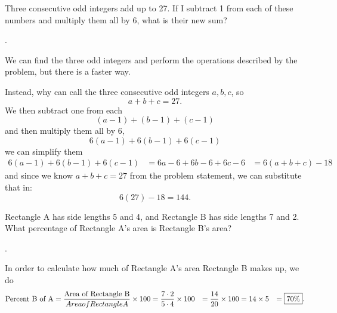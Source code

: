 \documentclass[11pt]{article}
\DeclareRobustCommand{\frac}[3][0pt]{%
  {\begingroup\hspace{#1}#2\hspace{#1}\endgroup\over\hspace{#1}#3\hspace{#1}}}
\begin{document}
\begin{problem}Three consecutive odd integers add up to 27. If I subtract 1 from each of these numbers and multiply them all by 6, what is their new sum?
\end{problem}
\begin{answer}
.
\end{answer}
\begin{solution}
We can find the three odd integers and perform the operations described by the problem, but there is a faster way. \par
Instead, why can call the three consecutive odd integers $a, b, c$, so 
$$a+b+c=27.$$
We then subtract one from each
$$(a-1)+(b-1)+(c-1)$$
and then multiply them all by 6,
$$6(a-1)+6(b-1)+6(c-1)$$
we can simplify them
\begin{align*}
6(a-1)+6(b-1)+6(c-1) &= 6a-6+6b-6+6c-6
&= 6(a+b+c) - 18
\end{align*}
and since we know $a+b+c=27$ from the problem statement, we can substitute that in:
$$6(27)-18 = \boxed{144}.$$
\end{solution}

\begin{problem}Rectangle A has side lengths 5 and 4, and Rectangle B has side lengths 7 and 2. What percentage of Rectangle A’s area is  Rectangle B’s area?
\end{problem}
\begin{answer}
.
\end{answer}
\begin{solution}
In order to calculate how much of Rectangle A’s area Rectangle B makes up, we do
\begin{align*} 
\text{Percent B of A} = \frac{\text{Area of Rectangle B}}{Area of Rectangle A} \times 100 &= \frac{7 \cdot 2}{5 \cdot 4} \times 100
&= \frac{14}{20} \times 100
&= 14 \times 5
&= \boxed{70 \%}.
\end{align*}
\end{solution}


\begin{problem}
\end{problem}

\begin{problem}
\end{problem}

\begin{problem}
\end{problem}
\end{document}
